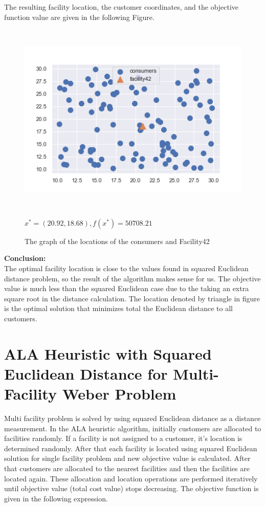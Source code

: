 \documentclass[12pt]{article}
\begin{document}
The resulting facility location, the customer coordinates, and the objective function value are given in the following Figure.
\begin{figure}[ht] 
    \centering
    \includegraphics[height=25em]{EucFacility42.png}
    \caption{The graph of the locations of the consumers and Facility42}
    \begin{center}
        \textit{$x^*= (20.92, 18.68), f(x^*)=50708.21$}
    \end{center}
\end{figure}
\FloatBarrier

\textbf{Conclusion:}\\
The optimal facility location is close to the values found in squared Euclidean distance problem, so the result of the algorithm makes sense for us. The objective value is much less than the squared Euclidean case due to the taking an extra square root in the distance calculation. The location denoted by triangle in figure is the optimal solution that minimizes total the Euclidean distance to all customers.


\section{ALA Heuristic with Squared Euclidean Distance for Multi-Facility Weber Problem}

Multi facility problem is solved by using squared Euclidean distance as a distance measurement. In the ALA heuristic algorithm, initially customers are allocated to facilities randomly. If a facility is not assigned to a customer, it's location is determined randomly. After that each facility is located using squared Euclidean solution for single facility problem and new objective value is calculated. After that customers are allocated to the nearest facilities and then the facilities are located again. These allocation and location operations are performed iteratively until objective value (total cost value) stops decreasing. The objective function is given in the following expression.
\end{document}
